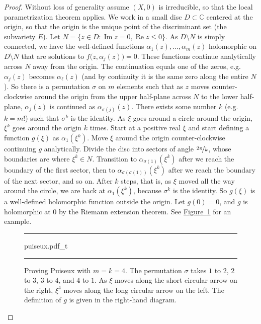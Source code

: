 \documentclass[12pt,openany]{book}
\renewcommand{\Re}{\operatorname{Re}}
\renewcommand{\Im}{\operatorname{Im}}
\newcommand{\C}{{\mathbb{C}}}
\theoremstyle{plain}
\theoremstyle{remark}
\theoremstyle{definition}
\newenvironment{myfig}{%
\begin{figure}[h!t]
\noindent\rule{\textwidth}{0.5pt}\vspace{12pt}\par\centering}%
{\par\noindent\rule{\textwidth}{0.5pt}
\end{figure}}
\theoremstyle{exercise}
\theoremstyle{example}
\newcommand{\figureref}[1]{\hyperref[#1]{Figure~\ref*{#1}}}
\begin{document}
\begin{proof}
Without loss of generality
assume $(X,0)$
is irreducible, so that
the local parametrization theorem applies.
We work in a small disc $D \subset \C$ centered at the origin, so that the
origin is the unique point of the discriminant set (the subvariety
$E$).  Let $N = \{ z \in D : \Im z = 0 , \Re z \leq 0 \}$.
As $D \setminus N$ is simply connected, we have the well-defined functions
$\alpha_1(z),\ldots,\alpha_m(z)$ holomorphic on $D \setminus N$
that are solutions to $f\bigl(z,\alpha_j(z)\bigr) = 0$.
These functions continue analytically across $N$ away from the
origin.  The continuation equals one of the zeros, e.g.\ $\alpha_j(z)$
becomes $\alpha_\ell(z)$ (and by continuity it is the
same zero along the entire $N$).  So there is
a permutation $\sigma$ on $m$ elements such that as $z$ moves
counter-clockwise around the origin from the upper half-plane across $N$ to the
lower half-plane,
$\alpha_j(z)$ is continued as $\alpha_{\sigma(j)}(z)$.
There exists some number $k$ (e.g.\ $k=m!$) such that $\sigma^k$ is the identity.
As $\xi$ goes around
a circle around the origin, $\xi^k$ goes around the origin $k$ times.
Start at a positive real $\xi$ and start defining a
function $g(\xi)$ as
$\alpha_1(\xi^k)$.
Move $\xi$ around the origin counter-clockwise continuing $g$ analytically.
Divide the disc into sectors of angle $\nicefrac{2\pi}{k}$,
whose boundaries are where $\xi^k \in N$.
Transition to $\alpha_{\sigma(1)}(\xi^k)$ after we reach the boundary
of the first sector, then to
$\alpha_{\sigma(\sigma(1))}(\xi^k)$ after we reach the boundary of the next sector, and so on.
After $k$ steps, that is, as
$\xi$ moved all the way around the circle,
we are back at $\alpha_1(\xi^k)$,
because
$\sigma^k$ is the identity.
So $g(\xi)$ is a well-defined holomorphic function outside the origin.  Let
$g(0) = 0$, and $g$ is holomorphic at $0$ by the Riemann extension theorem.
See \figureref{fig:puiseux} for an example.
\begin{myfig}
{puiseux.pdf_t}
\caption{Proving Puiseux with $m = k = 4$.  The permutation $\sigma$ takes
$1$ to $2$, $2$ to $3$, $3$ to $4$,
and $4$ to $1$.  As $\xi$ moves along the short circular arrow on the right, $\xi^4$
moves along the long circular arrow on the left.  The definition of $g$ is
given in the right-hand diagram.\label{fig:puiseux}}
\end{myfig}
\end{proof}
\end{document}
